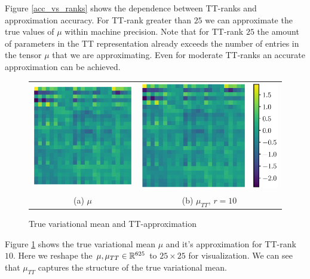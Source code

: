 Figure \ref{acc_vs_ranks} shows the dependence between TT-ranks and 
approximation accuracy. For TT-rank greater than $25$ we can approximate the
true values of $\mu$ within machine precision. Note that for TT-rank $25$ the
amount of parameters in the TT representation already exceeds the number of
entries in the tensor $\mu$ that we are approximating. Even for moderate
TT-ranks an accurate approximation can be achieved.

\begin{figure}[!h]
  \begin{center}
      \begin{tabular}{cc}
          \includegraphics[trim = 100 0 60 0, clip, height=0.4\linewidth]{pics/true.eps} &
        \hspace{0.5cm}\includegraphics[trim = 100 0 0 0, clip, height=0.4\linewidth]{pics/tt.eps} \\
          (a) $\mu$ &
          (b) $\mu_{TT}$, $r = 10$
      \end{tabular}
  \end{center}
  \caption{True variational mean and TT-approximation}
  \label{true_and_tt}
\end{figure}

Figure \ref{true_and_tt} shows the true variational mean $\mu$ and it's 
approximation for TT-rank $10$. Here we reshape the $\mu, \mu_{TT} \in \mathbb{R}^{625}$
to $25 \times 25$ for visualization. We can see that $\mu_{TT}$ captures the 
structure of the true variational mean.

